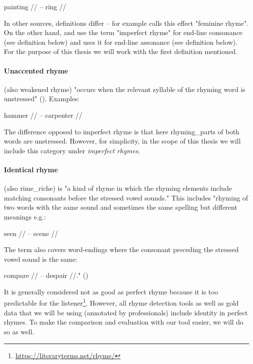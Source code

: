 painting // -- ring //

\noindent In other sources, definitions differ -- for example \cite{literarydevices2020} calls this effect "feminine rhyme".  On the other hand, \cite{oxforddict2008literary} and \cite{britannica} use the term "imperfect rhyme" for end-line consonance (see definition below) and \cite{vanphonological} uses it for end-line assonance (see definition below). For the purpose of this thesis we will work with the first definition mentioned.


\paragraph{Unaccented rhyme} (also weakened rhyme) "occurs when the relevant syllable of the rhyming word is unstressed" (\cite{britannica}). Examples: 

hammer // -- carpenter //

\noindent The difference opposed to imperfect rhyme is that here \gls{rhyming_part}s of both words are unstressed. However, for simplicity, in the scope of this thesis we will include this category under \textit{imperfect rhymes}.


\paragraph{Identical rhyme} (also \gls{rime_riche}) is "a kind of rhyme in which the rhyming elements include matching consonants before the stressed vowel sounds." This includes "rhyming of two words with the same sound and sometimes the same spelling but different meanings e.g.:

 seen // -- scene //
 
 The term also covers word‐endings where the consonant preceding the stressed vowel sound is the same: 
 
 compare // -- despair //." (\cite{oxforddict2008literary})
 
 It is generally considered not as good as perfect rhyme because it is too predictable for the listener\footnote{\url{https://literaryterms.net/rhyme/}}. However, all rhyme detection tools as well as gold data that we will be using (annotated by professionals) include identity in perfect rhymes. To make the comparison and evaluation with our tool easier, we will do so as well.

